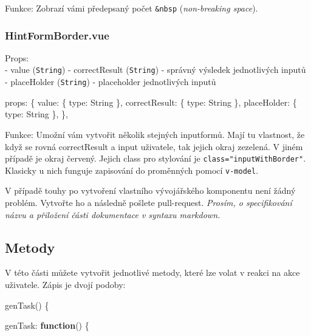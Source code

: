 \documentclass[
]{article}
\newenvironment{Shaded}{}{}
\newcommand{\AttributeTok}[1]{\textcolor[rgb]{0.49,0.56,0.16}{#1}}
\newcommand{\DataTypeTok}[1]{\textcolor[rgb]{0.56,0.13,0.00}{#1}}
\newcommand{\KeywordTok}[1]{\textcolor[rgb]{0.00,0.44,0.13}{\textbf{#1}}}
\newcommand{\NormalTok}[1]{#1}
\newcommand{\OperatorTok}[1]{\textcolor[rgb]{0.40,0.40,0.40}{#1}}
\begin{document}
Funkce: Zobrazí vámi předepsaný počet \texttt{\&nbsp}
(\emph{non-breaking space}).

\hypertarget{hintformborder.vue}{%
\subsubsection{HintFormBorder.vue}\label{hintformborder.vue}}

Props:\\
- value (\texttt{String}) - correctResult (\texttt{String}) - správný
výsledek jednotlivých inputů - placeHolder (\texttt{String}) -
placeholder jednotlivých inputů

\begin{Shaded}
\begin{Highlighting}[]
\NormalTok{props}\OperatorTok{:} \OperatorTok{\{}
    \DataTypeTok{value}\OperatorTok{:} \OperatorTok{\{}
        \DataTypeTok{type}\OperatorTok{:}\NormalTok{ String}
    \OperatorTok{\},}
    \DataTypeTok{correctResult}\OperatorTok{:} \OperatorTok{\{}
        \DataTypeTok{type}\OperatorTok{:}\NormalTok{ String}
    \OperatorTok{\},}
    \DataTypeTok{placeHolder}\OperatorTok{:} \OperatorTok{\{}
        \DataTypeTok{type}\OperatorTok{:}\NormalTok{ String}
    \OperatorTok{\},}
\OperatorTok{\},}
\end{Highlighting}
\end{Shaded}

Funkce: Umožní vám vytvořit několik stejných inputformů. Mají tu
vlastnost, že když se rovná correctResult a input uživatele, tak jejich
okraj zezelená. V jiném případě je okraj červený. Jejich class pro
stylování je \texttt{class="inputWithBorder"}. Klasicky u nich funguje
zapisování do proměnných pomocí \texttt{v-model}.

V případě touhy po vytvoření vlastního vývojářského komponentu není
žádný problém. Vytvořte ho a následně pošlete pull-request.
\emph{Prosím, o specifikování názvu a přiložení části dokumentace v
syntaxu markdown.}

\hypertarget{metody}{%
\subsection{Metody}\label{metody}}

V této části můžete vytvořit jednotlivé metody, které lze volat v reakci
na akce uživatele. Zápis je dvojí podoby:

\begin{Shaded}
\begin{Highlighting}[]
\AttributeTok{genTask}\NormalTok{() }\OperatorTok{\{} 
    
\DataTypeTok{genTask}\OperatorTok{:} \KeywordTok{function}\NormalTok{() }\OperatorTok{\{}
\end{Highlighting}
\end{Shaded}
\end{document}
